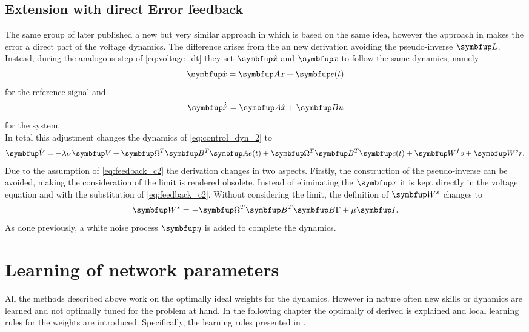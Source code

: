 \subsection{Extension with direct Error feedback}\label{ssec:extension}
The same group of \cite{huang_optimizing_2017} later published a new but very similar approach in \cite{huang_spiking_2019} which is based on the same idea, however the approach in \cite{huang_spiking_2019} makes the error a direct part of the voltage dynamics. The difference arises from the an new derivation avoiding the pseudo-inverse $\bmu{L}$.\\
Instead, during the analogous step of \cref{eq:voltage_dt} they set $\bmu{\hat{x}}$
and $\bmu{x}$ to follow the same dynamics, namely
\begin{equation}\label{eq:feedback_c2}
	\bmu{\dot{x}} = \bmu{Ax} + \bmu{c}(t)
\end{equation}
for the reference signal and
\begin{equation}
	\bmu{\dot{\hat{x}}} = \bmu{A\hat{x}} + \bmu{Bu}
\end{equation}
for the system.\\
In total this adjustment changes the dynamics of \cref{eq:control_dyn_2} to
\begin{equation}\label{eq:direct_error_voltage}
	\bmu{\dot{V}} = -\lambda_V\bmu{V} + \bmu{\Omega}^T \bmu{B}^T\bmu{Ae}(t) + \bmu{\Omega}^T \bmu{B}^T \bmu{c}(t) + \bmu{W^fo} + \bmu{W^sr}.
\end{equation}
Due to the assumption of \cref{eq:feedback_c2} the derivation changes in two aspects. Firstly, the construction of the pseudo-inverse can be avoided, making the consideration of the limit is rendered obsolete. Instead of eliminating the $\bmu{x}$ it is kept directly in the voltage equation and with the substitution of \cref{eq:feedback_c2}. Without considering the limit, the definition of $\bmu{W}^s$ changes to
\begin{equation}
	\bmu{W^s} = -\bmu{\Omega}^T\bmu{B}^T\bmu{B\Gamma} + \mu\bmu{I}.
\end{equation}
As done previously, a white noise process $\bmu{\eta}$ is added to complete the dynamics.
\section{Learning of network parameters}\label{sec:learning}
All the methods described above work on the optimally ideal weights for the dynamics. However in nature often new skills or dynamics are learned and not optimally tuned for the problem at hand. In the following chapter the optimally of derived is explained and local learning rules for the weights are introduced. Specifically, the learning rules presented in \cite{bourdoukan_learning_2012,brendel_learning_2020,bourdoukan_enforcing_2015}.


